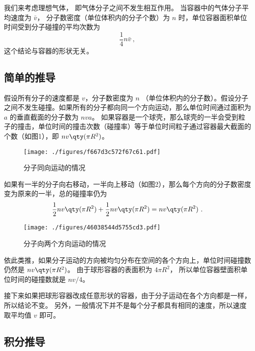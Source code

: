 
\begin{issues}
\issueTODO
\end{issues}


我们来考虑理想气体， 即气体分子之间不发生相互作用。 当容器中的气体分子平均速度为 $\bar v$， 分子数密度（单位体积内的分子个数）为 $n$ 时，单位容器面积单位时间受到分子碰撞的平均次数为
\begin{equation}
\frac14 n\bar v~,
\end{equation}
这个结论与容器的形状无关。

\subsection{简单的推导}

假设所有分子的速度都是 $v$，分子数密度为 $n$ （单位体积内的分子数）。假设分子之间不发生碰撞。如果所有的分子都向同一个方向运动，那么单位时间通过面积为 $a$ 的垂直截面的分子数为 $nva$。 如果容器是一个球壳，那么球壳的一半会受到粒子的撞击，单位时间的撞击次数（碰撞率）等于单位时间粒子通过容器最大截面的个数（如图1），即 $nv \qty(\pi R^2)$。 
\begin{figure}[ht]
\centering
\texttt{[image: ./figures/f667d3c572f67c61.pdf]}
\caption{分子同向运动的情况} \label{fig_AvgHit_1}
\end{figure}
如果有一半的分子向右移动，一半向上移动（如图2），那么每个方向的分子数密度变为原来的一半，总的碰撞率仍为
\begin{equation}
\frac12 nv \qty(\pi R^2) + \frac12 nv \qty(\pi R^2) = nv \qty(\pi R^2)~.
\end{equation}


\begin{figure}[ht]
\centering
\texttt{[image: ./figures/46038544d5755cd3.pdf]}
\caption{分子向两个方向运动的情况} \label{fig_AvgHit_2}
\end{figure}
依此类推，如果分子运动的方向被均匀分布在空间的各个方向上，单位时间碰撞数仍然是 $nv \qty(\pi R^2)$。
由于球形容器的表面积为 $4\pi R^2$， 所以单位容器壁面积单位时间的碰撞数就是 $nv/4$。 

接下来如果把球形容器改成任意形状的容器，由于分子运动在各个方向都是一样，所以结论不变。 另外，一般情况下并不是每个分子都具有相同的速度，所以速度取平均值 $v$ 即可。

\subsection{积分推导}
